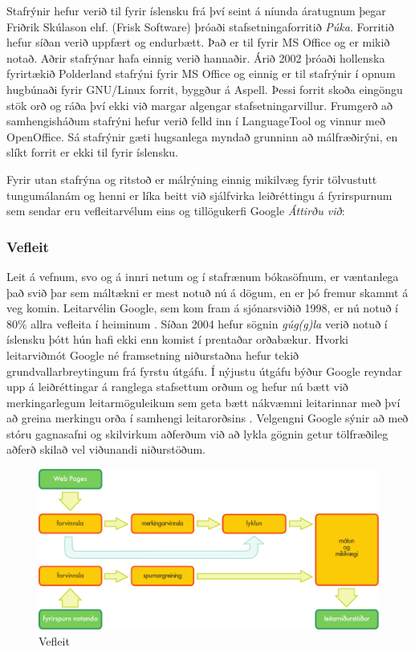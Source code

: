 \documentclass{../../metanetpaper}
\begin{document}
\begin{multicols}{2}
Stafrýnir hefur verið til fyrir íslensku frá því seint á níunda áratugnum þegar Friðrik Skúlason ehf. (Frisk Software) þróaði stafsetningaforritið \textit{Púka}. Forritið hefur síðan verið uppfært og endurbætt. Það er til fyrir MS Office og er mikið notað. Aðrir stafrýnar hafa einnig verið hannaðir. Árið 2002 þróaði hollenska fyrirtækið Polderland stafrýni fyrir MS Office og einnig er til stafrýnir í opnum hugbúnaði fyrir GNU/Linux forrit, byggður á Aspell. Þessi forrit skoða eingöngu stök orð og ráða því ekki við margar algengar stafsetningarvillur. Frumgerð að samhengisháðum stafrýni hefur verið felld inn í LanguageTool \cite{lto1} og vinnur með OpenOffice. Sá stafrýnir gæti hugsanlega myndað grunninn að málfræðirýni, en slíkt forrit er ekki til fyrir íslensku. 

Fyrir utan stafrýna og ritstoð er málrýning einnig mikilvæg fyrir tölvustutt tungumálanám og henni er líka beitt við sjálfvirka leiðréttingu á fyrirspurnum sem sendar eru vefleitarvélum eins og tillögukerfi Google \textit{Áttirðu við}:

\subsubsection{Vefleit}

Leit á vefnum, svo og á innri netum og í stafrænum bókasöfnum, er væntanlega það svið þar sem máltækni er mest notuð nú á dögum, en er þó fremur skammt á veg komin. Leitarvélin Google, sem kom fram á sjónarsviðið 1998, er nú notuð í 80\% allra vefleita í heiminum \cite{spi1}.  Síðan 2004 hefur sögnin  \textit{gúg(g)la} verið notuð í íslensku þótt hún hafi ekki enn komist í prentaðar orðabækur. Hvorki leitarviðmót Google né framsetning niðurstaðna hefur tekið grundvallarbreytingum frá fyrstu útgáfu. Í nýjustu útgáfu býður Google reyndar upp á leiðréttingar á ranglega stafsettum orðum og hefur nú bætt við merkingarlegum leitarmöguleikum sem geta bætt nákvæmni leitarinnar með því að greina merkingu orða í samhengi leitarorðsins \cite{pc1}.  Velgengni Google sýnir að með stóru gagnasafni og skilvirkum aðferðum við að lykla gögnin getur tölfræðileg aðferð skilað vel viðunandi niðurstöðum.

\begin{figure}[htb]
  \center
  \includegraphics[width=\textwidth]{../_media/icelandic/web_search_architecture}
  \caption{Vefleit}
  \label{fig:websearcharch_is}
\end{figure}


\end{multicols}
\end{document}
